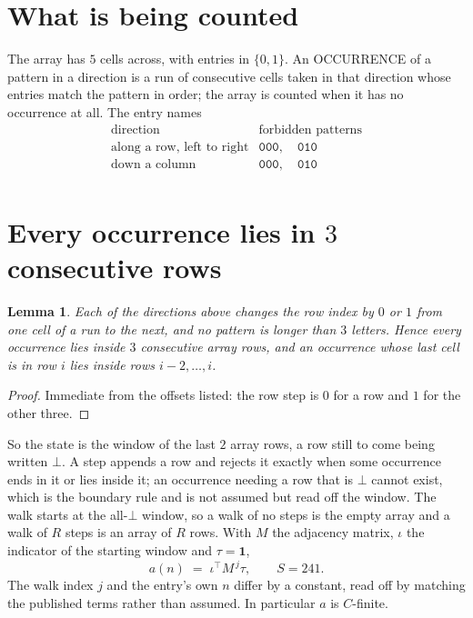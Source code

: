 \documentclass[11pt,a4paper]{article}
\theoremstyle{plain}
\newtheorem{lemma}[theorem]{Lemma}
\theoremstyle{definition}
\begin{document}
\section{What is being counted}

The array has $5$ cells across, with entries in $\{0,1\}$. An OCCURRENCE of a pattern in a
direction is a run of consecutive cells taken in that direction whose entries match the pattern
in order; the array is counted when it has no occurrence at all. The entry names
\[
\begin{array}{ll}
\text{direction} & \text{forbidden patterns} \\[2pt]
\text{along a row, left to right} & \mathtt{000},\quad \mathtt{010} \\
\text{down a column} & \mathtt{000},\quad \mathtt{010} \\
\end{array}
\]


\section{Every occurrence lies in $3$ consecutive rows}

\begin{lemma}\label{lem:win}
Each of the directions above changes the row index by $0$ or $1$ from one cell of a run to the
next, and no pattern is longer than $3$ letters. Hence every occurrence lies inside $3$
consecutive array rows, and an occurrence whose last cell is in row $i$ lies inside rows
$i-2,\dots,i$.
\end{lemma}

\begin{proof}
Immediate from the offsets listed: the row step is $0$ for a row and $1$ for the other three.
\end{proof}

So the state is the window of the last $2$ array rows, a row still to come being written
$\bot$. A step appends a row and rejects it exactly when some occurrence ends in it or lies
inside it; an occurrence needing a row that is $\bot$ cannot exist, which is the boundary rule
and is not assumed but read off the window. The walk starts at the all-$\bot$ window, so a walk
of no steps is the empty array and a walk of $R$ steps is an array of $R$ rows. With $M$ the
adjacency matrix, $\iota$ the indicator of the starting window and $\tau=\mathbf{1}$,
\[
a(n)\;=\;\iota^{\!\top}M^{\,j}\tau ,\qquad S=241.
\]
The walk index $j$ and the entry's own $n$ differ by a constant, read off by matching the
published terms rather than assumed. In particular $a$ is $C$-finite.
\end{document}
